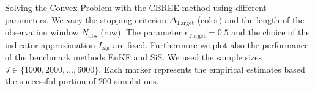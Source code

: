 Solving the Convex Problem with the CBREE method using  different parameters. We vary the stopping criterion $\Delta_{\text{Target}}$ (color) and the length of the observation window $N_\text{obs}$ (row). The parameter $\epsilon_{\text{Target}} = 0.5$ and the choice of the indicator approximation $I_\text{alg}$ are fixed. Furthermore we plot also the performance of the benchmark methods EnKF and SiS. We used the sample sizes $J \in \{1000, 2000, \ldots, 6000\}$. Each marker represents the empirical estimates based the successful portion of $200$ simulations.